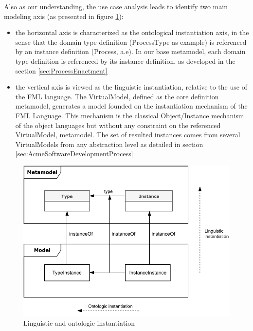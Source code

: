 Also as our understanding, the use case analysis leads to identify two main modeling axis (as presented in figure \ref{fig:LinguisticAndOntologicInstantiation}):
\begin{itemize}
    \item the horizontal axis is characterized as the ontological instantiation axis, in the sense that the domain type definition (ProcessType as example) is referenced by an instance definition (Process, a.e). In our base metamodel, each domain type definition is referenced by its instance definition, as developed in the section \ref{sec:ProcessEnactment}

\item the vertical axis is viewed as the linguistic instantiation, relative to the use of the FML language. The VirtualModel, defined as the core definition metamodel, generates a model founded on the instantiation mechanism of the FML Language. This mechanism is the classical Object/Instance mechanism of the object languages but without any constraint on the referenced VirtualModel, \ie metamodel. The set of resulted instances comes from several VirtualModels 
from any abstraction level as detailed in section \ref{sec:AcmeSoftwareDevelopmentProcess}


\end{itemize}

\begin{figure}
    \centering
    \includegraphics[width=1.0 \columnwidth]{Figures/Instantiation.pdf}
    \caption{Linguistic and ontologic instantiation}
    \label{fig:LinguisticAndOntologicInstantiation}
\end{figure}

